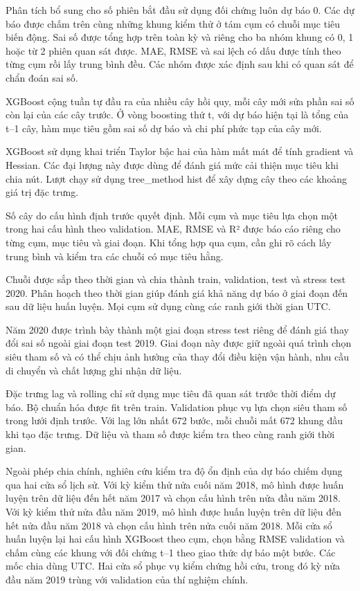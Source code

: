 \documentclass[conference,a4paper]{IEEEtran}
\begin{document}
Phân tích bổ sung cho số phiên bắt đầu sử dụng đối chứng luôn dự báo 0. Các dự báo được chấm trên cùng những khung kiểm thử ở tám cụm có chuỗi mục tiêu biến động. Sai số được tổng hợp trên toàn kỳ và riêng cho ba nhóm khung có 0, 1 hoặc từ 2 phiên quan sát được. MAE, RMSE và sai lệch có dấu được tính theo từng cụm rồi lấy trung bình đều. Các nhóm được xác định sau khi có quan sát để chẩn đoán sai số.

XGBoost cộng tuần tự đầu ra của nhiều cây hồi quy, mỗi cây mới sửa phần sai số còn lại của các cây trước. Ở vòng boosting thứ t, với dự báo hiện tại là tổng của t–1 cây, hàm mục tiêu gồm sai số dự báo và chi phí phức tạp của cây mới.

XGBoost sử dụng khai triển Taylor bậc hai của hàm mất mát để tính gradient và Hessian. Các đại lượng này được dùng để đánh giá mức cải thiện mục tiêu khi chia nút. Lượt chạy sử dụng tree\_method hist để xây dựng cây theo các khoảng giá trị đặc trưng.

Số cây do cấu hình định trước quyết định. Mỗi cụm và mục tiêu lựa chọn một trong hai cấu hình theo validation. MAE, RMSE và R² được báo cáo riêng cho từng cụm, mục tiêu và giai đoạn. Khi tổng hợp qua cụm, cần ghi rõ cách lấy trung bình và kiểm tra các chuỗi có mục tiêu hằng.

Chuỗi được sắp theo thời gian và chia thành train, validation, test và stress test 2020. Phân hoạch theo thời gian giúp đánh giá khả năng dự báo ở giai đoạn đến sau dữ liệu huấn luyện. Mọi cụm sử dụng cùng các ranh giới thời gian UTC.

Năm 2020 được trình bày thành một giai đoạn stress test riêng để đánh giá thay đổi sai số ngoài giai đoạn test 2019. Giai đoạn này được giữ ngoài quá trình chọn siêu tham số và có thể chịu ảnh hưởng của thay đổi điều kiện vận hành, nhu cầu di chuyển và chất lượng ghi nhận dữ liệu.

Đặc trưng lag và rolling chỉ sử dụng mục tiêu đã quan sát trước thời điểm dự báo. Bộ chuẩn hóa được fit trên train. Validation phục vụ lựa chọn siêu tham số trong lưới định trước. Với lag lớn nhất 672 bước, mỗi chuỗi mất 672 khung đầu khi tạo đặc trưng. Dữ liệu và tham số được kiểm tra theo cùng ranh giới thời gian.

Ngoài phép chia chính, nghiên cứu kiểm tra độ ổn định của dự báo chiếm dụng qua hai cửa sổ lịch sử. Với kỳ kiểm thử nửa cuối năm 2018, mô hình được huấn luyện trên dữ liệu đến hết năm 2017 và chọn cấu hình trên nửa đầu năm 2018. Với kỳ kiểm thử nửa đầu năm 2019, mô hình được huấn luyện trên dữ liệu đến hết nửa đầu năm 2018 và chọn cấu hình trên nửa cuối năm 2018. Mỗi cửa sổ huấn luyện lại hai cấu hình XGBoost theo cụm, chọn bằng RMSE validation và chấm cùng các khung với đối chứng t–1 theo giao thức dự báo một bước. Các mốc chia dùng UTC. Hai cửa sổ phục vụ kiểm chứng hồi cứu, trong đó kỳ nửa đầu năm 2019 trùng với validation của thí nghiệm chính.
\end{document}

